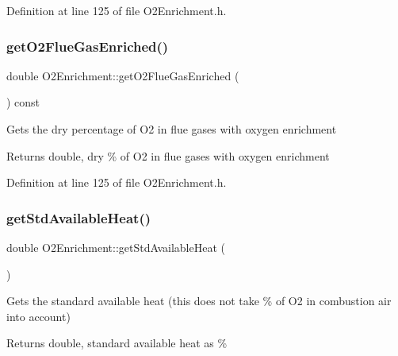 Definition at line 125 of file O2\+Enrichment.\+h.

\mbox{\label{class_o2_enrichment_a274eddb78560dd502a3c5947ac7e6b96}} 
\subsubsection{\texorpdfstring{get\+O2\+Flue\+Gas\+Enriched()}{getO2FlueGasEnriched()}\hspace{0.1cm}{\footnotesize\ttfamily [3/3]}}
{\footnotesize\ttfamily double O2\+Enrichment\+::get\+O2\+Flue\+Gas\+Enriched (\begin{DoxyParamCaption}{ }\end{DoxyParamCaption}) const\hspace{0.3cm}{\ttfamily [inline]}}

Gets the dry percentage of O2 in flue gases with oxygen enrichment \begin{DoxyReturn}{Returns}
double, dry \% of O2 in flue gases with oxygen enrichment 
\end{DoxyReturn}


Definition at line 125 of file O2\+Enrichment.\+h.

\mbox{\label{class_o2_enrichment_a6eab50d08baaca010d208139cb99d239}} 
\subsubsection{\texorpdfstring{get\+Std\+Available\+Heat()}{getStdAvailableHeat()}\hspace{0.1cm}{\footnotesize\ttfamily [1/3]}}
{\footnotesize\ttfamily double O2\+Enrichment\+::get\+Std\+Available\+Heat (\begin{DoxyParamCaption}{ }\end{DoxyParamCaption})\hspace{0.3cm}{\ttfamily [inline]}}

Gets the standard available heat (this does not take \% of O2 in combustion air into account) \begin{DoxyReturn}{Returns}
double, standard available heat as \% 
\end{DoxyReturn}


